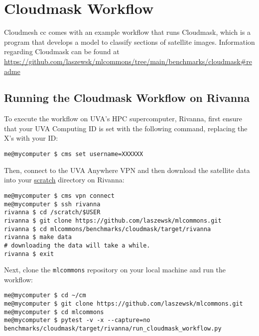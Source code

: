 
\section{Cloudmask Workflow}\label{cloudmask-workflow}

Cloudmesh cc comes with an example workflow that runs Cloudmask, which
is a program that develops a model to classify sections of satellite
images. Information regarding Cloudmask can be found at
\url{https://github.com/laszewsk/mlcommons/tree/main/benchmarks/cloudmask\#readme}

\subsection{Running the Cloudmask Workflow on
Rivanna}\label{running-the-cloudmask-workflow-on-rivanna}

To execute the workflow on UVA's HPC supercomputer, Rivanna, first
ensure that your UVA Computing ID is set with the following command,
replacing the X's with your ID:

\begin{verbatim}
me@mycomputer $ cms set username=XXXXXX
\end{verbatim}

Then, connect to the UVA Anywhere VPN and then download the satellite
data into your
\href{https://www.rc.virginia.edu/userinfo/storage/non-sensitive-data/\#scratch}{scratch}
directory on Rivanna:

\bigbreak
\begin{verbatim}
me@mycomputer $ cms vpn connect
me@mycomputer $ ssh rivanna
rivanna $ cd /scratch/$USER
rivanna $ git clone https://github.com/laszewsk/mlcommons.git
rivanna $ cd mlcommons/benchmarks/cloudmask/target/rivanna
rivanna $ make data
# downloading the data will take a while.
rivanna $ exit
\end{verbatim}
\bigbreak

Next, clone the \texttt{mlcommons} repository on your local machine and
run the workflow:

\bigbreak
\begin{verbatim}
me@mycomputer $ cd ~/cm
me@mycomputer $ git clone https://github.com/laszewsk/mlcommons.git
me@mycomputer $ cd mlcommons
me@mycomputer $ pytest -v -x --capture=no benchmarks/cloudmask/target/rivanna/run_cloudmask_workflow.py
\end{verbatim}
\bigbreak

